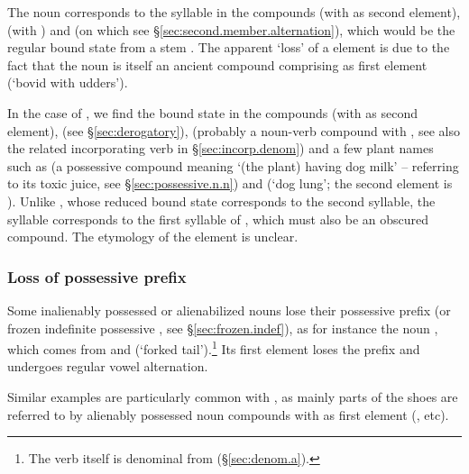 The noun  corresponds to the syllable  in the compounds  (with  as second element),  (with ) and  (on which see §\ref{sec:second.member.alternation}), which would be the regular bound state from a stem . The apparent `loss' of a  element is due to the fact that the noun  is itself an ancient compound comprising  as first element (`bovid with udders').

In the case of , we find the bound state  in the compounds  (with  as second element),  (see §\ref{sec:derogatory}),  (probably a noun-verb compound with , see also the related incorporating verb in §\ref{sec:incorp.denom}) and a few plant names such as  (a possessive compound meaning `(the plant) having dog milk' -- referring to its toxic juice, see §\ref{sec:possessive.n.n}) and  (`dog lung'; the second element is ). Unlike , whose reduced bound state corresponds to the second syllable, the syllable  corresponds to the first syllable of , which must also be an obscured compound. The etymology of the element  is unclear.

\subsubsection{Loss of possessive prefix} \label{sec:loss.possessive.prefix.compounds}
Some inalienably possessed or alienabilized nouns lose their possessive prefix (or frozen indefinite possessive , see §\ref{sec:frozen.indef}), as for instance the noun , which comes from  and  (`forked tail').\footnote{The verb  itself is denominal from  (§\ref{sec:denom.a}).} Its first element  loses the prefix  and undergoes regular vowel alternation. 

Similar examples are particularly common with , as mainly parts of the shoes are referred to by alienably possessed noun compounds with  as first element (,  etc).

